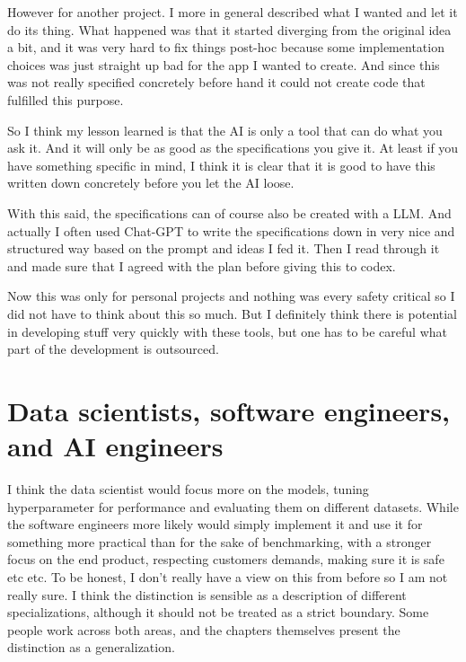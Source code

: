 \documentclass[11pt]{article}
\begin{document}
However for another project. I more in general described what I wanted and let it do its thing. What happened was that it started diverging from the original idea a bit, and it was very hard to fix things post-hoc because some implementation choices was just straight up bad for the app I wanted to create. And since this was not really specified concretely before hand it could not create code that fulfilled this purpose.

So I think my lesson learned is that the AI is only a tool that can do what you ask it. And it will only be as good as the specifications you give it. At least if you have something specific in mind, I think it is clear that it is good to have this written down concretely before you let the AI loose.

With this said, the specifications can of course also be created with a LLM. And actually I often used Chat-GPT to write the specifications down in very nice and structured way based on the prompt and ideas I fed it. Then I read through it and made sure that I agreed with the plan before giving this to codex. 

Now this was only for personal projects and nothing was every safety critical so I did not have to think about this so much. But I definitely think there is potential in developing stuff very quickly with these tools, but one has to be careful what part of the development is outsourced.

\section{Data scientists, software engineers, and AI engineers}
I think the data scientist would focus more on the models, tuning hyperparameter for performance and evaluating them on different datasets. While the software engineers more likely would simply implement it and use it for something more practical than for the sake of benchmarking, with a stronger focus on the end product, respecting customers demands, making sure it is safe etc etc. To be honest, I don't really have a view on this from before so I am not really sure. I think the distinction is sensible as a description of different specializations, although it should not be treated as a strict boundary. Some people work across both areas, and the chapters themselves present the distinction as a generalization.
\end{document}
